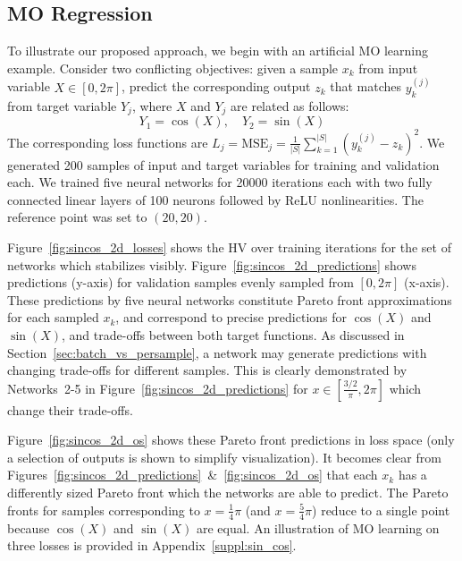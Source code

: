 \subsection{MO Regression}
\label{sec:sin_cos}
To illustrate our proposed approach, we begin with an artificial MO learning example. Consider two conflicting objectives: given a sample $x_k$ from input variable $X\in [0,2\pi]$, predict the corresponding output $z_{k}$ that matches $y_{k}^{(j)}$ from target variable $Y_{j}$, where $X$ and $Y_{j}$ are related as follows:
\begin{equation*}
  Y_{1}=\cos(X),\quad Y_{2}=\sin(X)
\end{equation*}
The corresponding loss functions are $L_{j}=\mathrm{MSE}_{j}=\tfrac{1}{|S|}\sum_{k=1}^{|S|}(y_{k}^{(j)}-z_{k})^{2}$. We generated 200 samples of input and target variables for training and validation each. We trained five neural networks for 20000 iterations each with two fully connected linear layers of 100 neurons followed by ReLU nonlinearities. The reference point was set to $(20,20)$.

Figure~\ref{fig:sincos_2d_losses} shows the HV over training iterations for the set of networks which stabilizes visibly. Figure~\ref{fig:sincos_2d_predictions} shows predictions (y-axis) for validation samples evenly sampled from $[0,2\pi]$ (x-axis). These predictions by five neural networks constitute Pareto front approximations for each sampled $x_k$, and correspond to precise predictions for $\cos(X)$ and $\sin(X)$, and trade-offs between both target functions. As discussed in Section~\ref{sec:batch_vs_persample}, a network may generate predictions with changing trade-offs for different samples. This is clearly demonstrated by Networks~2-5 in Figure~\ref{fig:sincos_2d_predictions} for $x\in [\tfrac{3/2}\pi,2\pi]$ which change their trade-offs.

Figure~\ref{fig:sincos_2d_os} shows these Pareto front predictions in loss space (only a selection of outputs is shown to simplify visualization). It becomes clear from Figures~\ref{fig:sincos_2d_predictions}~\&~\ref{fig:sincos_2d_os} that each $x_k$ has a differently sized Pareto front which the networks are able to predict. The Pareto fronts for samples corresponding to $x =\tfrac{1}{4}\pi$ (and $x=\tfrac{5}{4}\pi$) reduce to a single point because $\cos(X)$ and $\sin(X)$ are equal. An illustration of MO learning on three losses is provided in Appendix~\ref{suppl:sin_cos}.


